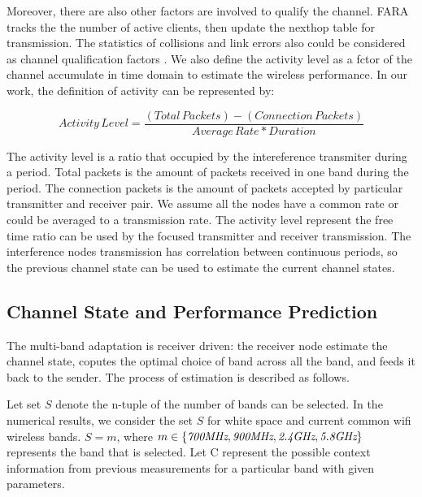 Moreover, there are also other factors are involved to qualify the channel. 
FARA tracks the the number of active clients, then update the nexthop table for transmission\cite{rahul2009frequency}.
The statistics of collisions and link errors also could be considered as channel qualification factors \cite{pang2005rate}.
We also define the activity level as a fctor of the channel accumulate in time domain to estimate the wireless performance.
In our work, the definition of activity can be represented by:


\begin{equation}
\label{equation:Activity Level}
Activity\,Level = \frac{(Total\, Packets)-(Connection\, Packets)}{Average\, Rate*Duration}
\end{equation}

The activity level is a ratio that occupied by the intereference transmiter during a period. Total packets is the amount of packets received in one band during the period. The connection packets is the amount of packets accepted by particular transmitter and receiver pair. We assume all the nodes have a common rate or could be averaged to a transmission rate. The activity level represent the free time ratio can be used by the focused transmitter and receiver transmission. The interference nodes transmission has correlation between continuous periods, so the previous channel state can be used to estimate the current channel states.


\subsection{Channel State and Performance Prediction}

The multi-band adaptation is receiver driven: the receiver node estimate the channel state, coputes the optimal choice of band across all the band, and feeds it back to the sender. The process of estimation is described as follows.

Let set $S$ denote the n-tuple of the number of bands can be selected. In the numerical results, we consider the set $S$ for white space and current common wifi wireless bands. $S={m}$, where $m \in \{\mbox{\it 700MHz},\mbox{\it 900MHz},\mbox{\it 2.4GHz},\mbox{\it 5.8GHz}\}$ represents the band that is selected. Let C represent the possible context information from previous measurements for a particular band with given parameters.

